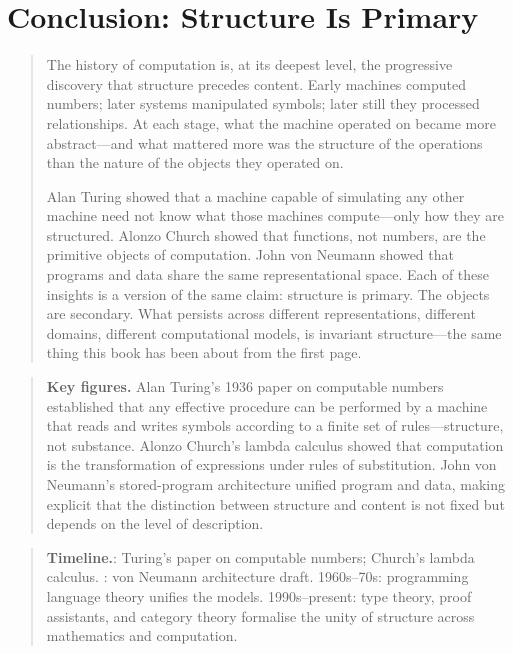\documentclass[11pt]{book}
\theoremstyle{plain}
\theoremstyle{definition}
\theoremstyle{remark}
\newenvironment{historicalpreamble}
  {\begin{quote}\small}
  {\end{quote}}
\newenvironment{historicalfigures}
  {\begin{quote}\small\textbf{Key figures.}\enspace\ignorespaces}
  {\end{quote}}
\newenvironment{paradigmtimeline}
  {\begin{quote}\small\textbf{Timeline.}\enspace\ignorespaces}
  {\end{quote}}
\begin{document}
\chapter{Conclusion: Structure Is Primary}

\begin{historicalpreamble}
The history of computation is, at its deepest level, the progressive
discovery that structure precedes content. Early machines computed
numbers; later systems manipulated symbols; later still they processed
relationships. At each stage, what the machine operated on became more
abstract---and what mattered more was the structure of the operations
than the nature of the objects they operated on.

Alan Turing showed that a machine capable of simulating any other
machine need not know what those machines compute---only how they are
structured. Alonzo Church showed that functions, not numbers, are the
primitive objects of computation. John von Neumann showed that programs
and data share the same representational space. Each of these insights
is a version of the same claim: structure is primary. The objects are
secondary. What persists across different representations, different
domains, different computational models, is invariant structure---the
same thing this book has been about from the first page.
\end{historicalpreamble}

\begin{historicalfigures}
Alan Turing's 1936 paper on computable numbers established that any
effective procedure can be performed by a machine that reads and writes
symbols according to a finite set of rules---structure, not substance.
Alonzo Church's lambda calculus showed that computation is the
transformation of expressions under rules of substitution. John von
Neumann's stored-program architecture unified program and data, making
explicit that the distinction between structure and content is not fixed
but depends on the level of description.
\end{historicalfigures}

\begin{paradigmtimeline}
1936: Turing's paper on computable numbers; Church's lambda calculus. : von Neumann architecture draft. \quad
1960s--70s: programming language theory unifies the models. \quad
1990s--present: type theory, proof assistants, and category theory
formalise the unity of structure across mathematics and computation.
\end{paradigmtimeline}
\end{document}
